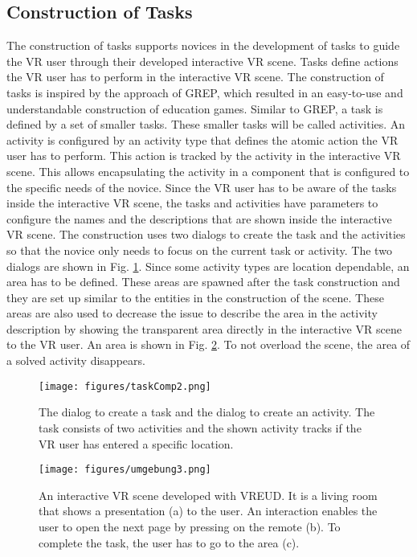 \documentclass[conference]{IEEEtran}
\begin{document}
\subsection{Construction of Tasks}
The construction of tasks supports novices in the development of tasks to guide the VR user through their developed interactive VR scene. Tasks define actions the \ac{VR} user has to perform in the interactive \ac{VR} scene. The construction of tasks is inspired by the approach of \ac{GREP}\cite{EUDGames-GREP}, which resulted in an easy-to-use and understandable construction of education games. Similar to \ac{GREP}, a task is defined by a set of smaller tasks. These smaller tasks will be called activities. An activity is configured by an activity type that defines the atomic action the VR user has to perform. This action is tracked by the activity in the interactive VR scene. This allows encapsulating the activity in a component that is configured to the specific needs of the novice. Since the VR user has to be aware of the tasks inside the interactive VR scene, the tasks and activities have parameters to configure the names and the descriptions that are shown inside the interactive VR scene. The construction uses two dialogs to create the task and the activities so that the novice only needs to focus on the current task or activity. The two dialogs are shown in Fig. \ref{taskDialog}. Since some activity types are location dependable, an area has to be defined. These areas are spawned after the task construction and they are set up similar to the entities in the construction of the scene. These areas are also used to decrease the issue to describe the area in the activity description by showing the transparent area directly in the interactive VR scene to the \ac{VR} user. An area is shown in Fig. \ref{scene}. To not overload the scene, the area of a solved activity disappears. 

    \begin{figure}[htbp]
\centerline{\texttt{[image: figures/taskComp2.png]}}
\caption{The dialog to create a task and the dialog to create an activity. The task consists of two activities and the shown activity tracks if the \ac{VR} user has entered a specific location.}
\label{taskDialog}
\end{figure}

    \begin{figure}[htbp]
\centerline{\texttt{[image: figures/umgebung3.png]}}
\caption{An interactive \ac{VR} scene developed with VREUD. It is a living room that shows a presentation (a) to the user. An interaction enables the user to open the next page by pressing on the remote (b). To complete the task, the user has to go to the area (c).}
\label{scene}
\end{figure}
\end{document}
